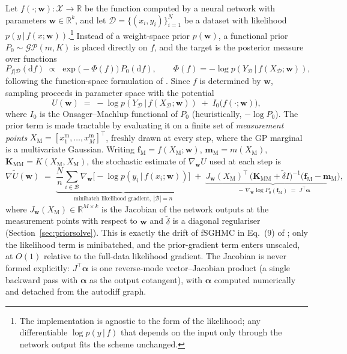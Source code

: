 \documentclass[11pt]{article}
\newcommand{\w}{\mathbf{w}}
\newcommand{\XM}{X_{\mathrm{M}}}
\newcommand{\fM}{\mathbf{f}_{\mathrm{M}}}
\newcommand{\mM}{\mathbf{m}_{\mathrm{M}}}
\newcommand{\KMM}{\mathbf{K}_{\mathrm{MM}}}
\newcommand{\gp}{\mathcal{GP}}
\newcommand{\D}{\mathcal{D}}
\newcommand{\gradU}{\nabla \widetilde{U}}
\begin{document}
Let $f(\cdot;\w):\mathcal{X}\to\mathbb{R}$ be the function computed by a
neural network with parameters $\w\in\mathbb{R}^k$, and let
$\D=\{(x_i,y_i)\}_{i=1}^{N}$ be a dataset with likelihood
$p(y\,|\,f(x;\w))$.\footnote{The implementation is agnostic to the form of the
likelihood; any differentiable $\log p(y\,|\,f)$ that depends on the input
only through the network output fits the scheme unchanged.}
Instead of a weight-space prior $p(\w)$, a functional prior
$P_0 \sim \gp(m,K)$ is placed directly on $f$, and the target is the
posterior measure over functions
\begin{equation}
  P_{f|\D}(\mathrm{d}f) \;\propto\;
  \exp\!\bigl(-\Phi(f)\bigr)\,P_0(\mathrm{d}f),
  \qquad
  \Phi(f) = -\log p(Y_\D \,|\, f(X_\D;\w)),
\end{equation}
following the function-space formulation of \cite{wu2025}.  Since $f$ is
determined by $\w$, sampling proceeds in parameter space with the potential
\begin{equation}
  U(\w) \;=\; -\log p(Y_\D\,|\,f(X_\D;\w)) \;+\; I_0\bigl(f(\cdot;\w)\bigr),
  \label{eq:potential}
\end{equation}
where $I_0$ is the Onsager--Machlup functional of $P_0$ (heuristically,
$-\log P_0$).  The prior term is made tractable by evaluating it on a finite
set of \emph{measurement points}
$\XM = [x_1^{\mathrm{m}},\dots,x_M^{\mathrm{m}}]^\top$, freshly drawn at every
step, where the GP marginal is a multivariate Gaussian.  Writing
$\fM = f(\XM;\w)$, $\mM = m(\XM)$, $\KMM = K(\XM,\XM)$, the stochastic
estimate of $\nabla_\w U$ used at each step is
\begin{equation}
  \gradU(\w)
  \;=\;
  \underbrace{\frac{N}{n}\sum_{i\in\mathcal{B}}
      \nabla_\w \bigl[-\log p(y_i\,|\,f(x_i;\w))\bigr]}_{\text{minibatch likelihood
      gradient},\ |\mathcal{B}| = n}
  \;+\;
  \underbrace{J_\w(\XM)^\top\,
      \bigl(\KMM + \tilde\delta I\bigr)^{-1}\bigl(\fM - \mM\bigr)}_{
      \;-\,\nabla_\w \log P_0(\fM)\;=\;J^\top\bm{\alpha}},
  \label{eq:gradU}
\end{equation}
where $J_\w(\XM)\in\mathbb{R}^{M\times k}$ is the Jacobian of the network
outputs at the measurement points with respect to $\w$ and $\tilde\delta$ is a
diagonal regulariser (Section~\ref{sec:priorsolve}).  This is exactly the drift
of fSGHMC in Eq.~(9) of \cite{wu2025}; only the likelihood term is
minibatched, and the prior-gradient term enters unscaled, at $O(1)$ relative
to the full-data likelihood gradient.  The Jacobian is never formed
explicitly: $J^\top\bm{\alpha}$ is one reverse-mode vector--Jacobian product
(a single backward pass with $\bm{\alpha}$ as the output cotangent), with
$\bm{\alpha}$ computed numerically and detached from the autodiff graph.
\end{document}
